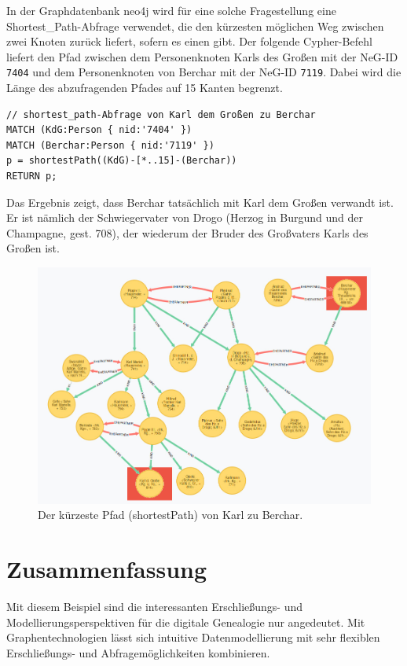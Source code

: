 \documentclass[ngerman,]{scrreprt}
\begin{document}
In der Graphdatenbank neo4j wird für eine solche Fragestellung eine Shortest\_Path-Abfrage verwendet, die den kürzesten möglichen Weg zwischen zwei Knoten zurück liefert, sofern es einen gibt. Der folgende Cypher-Befehl liefert den Pfad zwischen dem Personenknoten Karls des Großen mit der NeG-ID \texttt{7404} und dem Personenknoten von Berchar mit der NeG-ID \texttt{7119}. Dabei wird die Länge des abzufragenden Pfades auf 15 Kanten begrenzt.

\begin{verbatim}
// shortest_path-Abfrage von Karl dem Großen zu Berchar
MATCH (KdG:Person { nid:'7404' })
MATCH (Berchar:Person { nid:'7119' })
p = shortestPath((KdG)-[*..15]-(Berchar))
RETURN p;
\end{verbatim}

Das Ergebnis zeigt, dass Berchar tatsächlich mit Karl dem Großen verwandt ist. Er ist nämlich der Schwiegervater von Drogo (Herzog in Burgund und der Champagne, gest. 708), der wiederum der Bruder des Großvaters Karls des Großen ist.

\begin{figure}
\centering
\includegraphics{Bilder/NeG/050-Berchar-Karl-shortestpath.jpg}
\caption{Der kürzeste Pfad (shortestPath) von Karl zu Berchar.}
\end{figure}

\hypertarget{zusammenfassung-3}{%
\section{Zusammenfassung}\label{zusammenfassung-3}}

Mit diesem Beispiel sind die interessanten Erschließungs- und Modellierungsperspektiven für die digitale Genealogie nur angedeutet. Mit Graphentechnologien lässt sich intuitive Datenmodellierung mit sehr flexiblen Erschließungs- und Abfragemöglichkeiten kombinieren.
\end{document}
